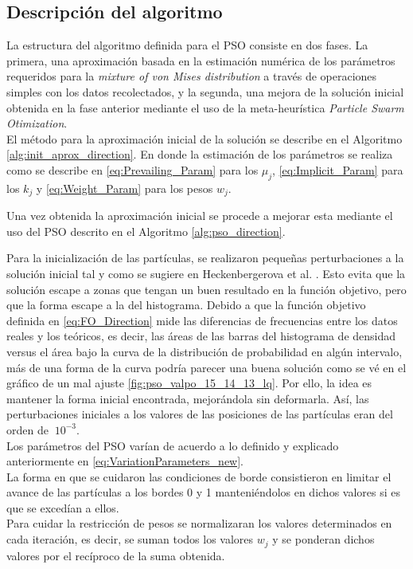 \subsection{Descripción del algoritmo}
La estructura del algoritmo definida para el PSO consiste en dos fases. La primera, una aproximación basada en la estimación numérica de los parámetros requeridos para la \emph{mixture of von Mises distribution} a través de operaciones simples con los datos recolectados, y la segunda, una mejora de la solución inicial obtenida en la fase anterior mediante el uso de la meta-heurística \emph{Particle Swarm Otimization}. \\
El método para la aproximación inicial de la solución se describe en el Algoritmo \ref{alg:init_aprox_direction}.
En donde la estimación de los parámetros se realiza como se describe en \ref{eq:Prevailing_Param} para los $\mu_j$, \ref{eq:Implicit_Param} para los $k_j$ y \ref{eq:Weight_Param} para los pesos $w_j$.

Una vez obtenida la aproximación inicial se procede a mejorar esta mediante el uso del PSO descrito en el Algoritmo \ref{alg:pso_direction}.

Para la inicialización de las partículas, se realizaron pequeñas perturbaciones a la solución inicial tal y como se sugiere en Heckenbergerova et al. \cite{Heckenbergerova15}. Esto evita que la solución escape a zonas que tengan un buen resultado en la función objetivo, pero que la forma escape a la del histograma. Debido a que la función objetivo definida en \ref{eq:FO_Direction} mide las diferencias de frecuencias entre los datos reales y los teóricos, es decir, las áreas de las barras del histograma de densidad versus el área bajo la curva de la distribución de probabilidad en algún intervalo, más de una forma de la curva podría parecer una buena solución como se vé en el gráfico de un mal ajuste \ref{fig:pso_valpo_15_14_13_lq}. Por ello, la idea es mantener la forma inicial encontrada, mejorándola sin deformarla. Así, las perturbaciones iniciales a los valores de las posiciones de las partículas eran del orden de $~ 10^{-3}$.\\
Los parámetros del PSO varían de acuerdo a lo definido y explicado anteriormente en \ref{eq:VariationParameters_new}.\\
La forma en que se cuidaron las condiciones de borde consistieron en limitar el avance de las partículas a los bordes 0 y 1 manteniéndolos en dichos valores si es que se excedían a ellos.\\
Para cuidar la restricción de pesos se normalizaran los valores determinados en cada iteración, es decir, se suman todos los valores $w_j$ y se ponderan dichos valores por el recíproco de la suma obtenida.\\
